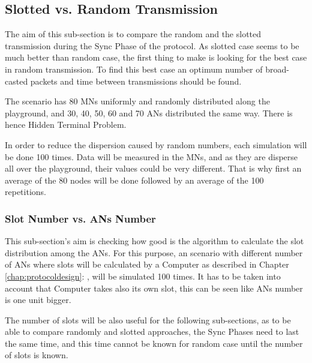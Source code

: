 \subsection{Slotted vs. Random Transmission}

The aim of this sub-section is to compare the random and the slotted transmission during the Sync Phase of the protocol. As slotted case seems to be
much better than random case, the first thing to make is looking for the best case in random transmission. To find this best case an optimum number
of broad-casted packets and time between transmissions should be found.

The scenario has 80 \acp{MN} uniformly and randomly distributed along the playground, and 30, 40, 50, 60 and 70 \acp{AN} distributed the same way.
There is hence Hidden Terminal Problem.

In order to reduce the dispersion caused by random numbers, each simulation will be done 100 times. Data will be measured in the \acp{MN}, and as 
they are disperse all over the playground, their values could be very different. That is why first an average of the 80 nodes will be done followed 
by an average of the 100 repetitions.

\subsubsection{Slot Number vs. \acp{AN} Number}

This sub-section's aim is checking how good is the algorithm to calculate the slot distribution among the \acp{AN}. For this purpose, an scenario 
with different number of \acp{AN} where slots will be calculated by a Computer as described in Chapter \ref{chap:protocoldesign}: 
, will be simulated 100 times. It has to be taken into account that Computer takes also its own slot, this can be seen
like \acp{AN} number is one unit bigger.

The number of slots will be also useful for the following sub-sections, as to be able to compare randomly and slotted approaches, the Sync Phases need 
to last the same time, and this time cannot be known for random case until the number of slots is known.

